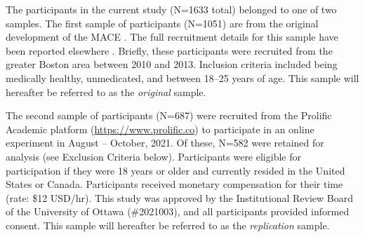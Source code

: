 \documentclass[letterpaper,man,natbib,noextraspace,floatsintext,longtable,12pt]{apa6}
\begin{document}
The participants in the current study (N=1633 total) belonged to one of two samples. The first sample of participants (N=1051) are from the original development of the MACE \citep{teicher2015maltreatment}. The full recruitment details for this sample have been reported elsewhere \citep{teicher2015maltreatment}. Briefly, these participants were recruited from the greater Boston area between 2010 and 2013. Inclusion criteria included being medically healthy, unmedicated, and between 18–25 years of age. This sample will hereafter be referred to as the \textit{original} sample. 

The second sample of participants (N=687) were recruited from the Prolific Academic platform (\url{https://www.prolific.co}) to participate in an online experiment in August -- October, 2021. Of these, N=582 were retained for analysis (see Exclusion Criteria below). Participants were eligible for participation if they were 18 years or older and currently resided in the United States or Canada. Participants received monetary compensation for their time (rate: \$12 USD/hr). This study was approved by the Institutional Review Board of the University of Ottawa (\#2021003), and all participants provided informed consent. This sample will hereafter be referred to as the \textit{replication} sample. 
\end{document}
